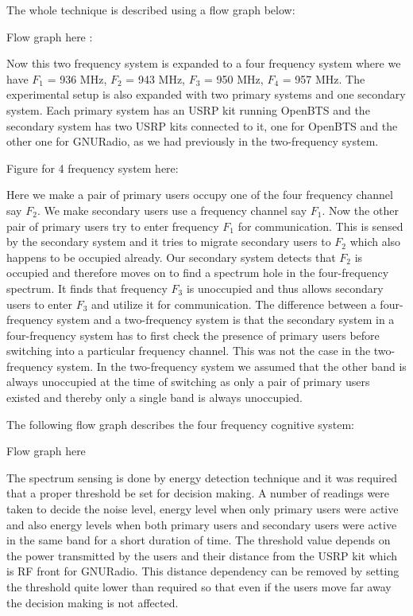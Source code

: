 The whole technique is described using a flow graph below:

Flow graph here :

Now this two frequency system is expanded to a 
four frequency system where we have $F_1$ = 936 MHz, 
$F_2$ = 943 MHz, $F_3$ = 950 MHz, $F_4$ = 957 MHz. The experimental setup
is also expanded with two primary systems and one secondary
system. Each primary system has an USRP kit running OpenBTS and
the secondary system has two USRP kits connected to it, one for OpenBTS
and the other one for GNURadio, as we had previously in the two-frequency 
system.
 
Figure for 4 frequency system here:


Here we make a pair of primary users occupy one of the four
frequency channel say $F_2$. We make secondary users use a frequency channel
say $F_1$. Now the other pair of primary users try to enter frequency
$F_1$ for communication. This is sensed by the secondary system 
and it tries to migrate secondary users to $F_2$ which also happens to be 
occupied already. Our secondary system detects that $F_2$ is occupied and
therefore moves on to find a spectrum hole in the four-frequency 
spectrum. It finds that frequency $F_3$ is unoccupied and thus
allows secondary users to enter $F_3$ and utilize it for communication.
The difference between a four-frequency system and a two-frequency system is 
that the secondary system in a four-frequency
system has to first check the presence of primary users before 
switching into a particular frequency channel.
This was not the case in the two-frequency system. In the
two-frequency system we assumed that the other band is always 
unoccupied at the time of switching as only a pair of primary
users existed and thereby only a single band is always unoccupied.


The following flow graph describes the four frequency cognitive system:

Flow graph here

The spectrum sensing is done by energy detection technique and
it was required that a proper threshold be set for decision making. 
A number of readings were taken to decide the noise level, energy 
level when only primary users were active and also energy levels 
when both primary users and secondary users were active in the same band 
for a short duration of time. The threshold value depends on the
power transmitted by the users and their distance from the USRP 
kit which is RF front for GNURadio. This distance dependency can 
be removed by setting the threshold quite lower than required so 
that even if the users move far away the decision making is not
affected. 






